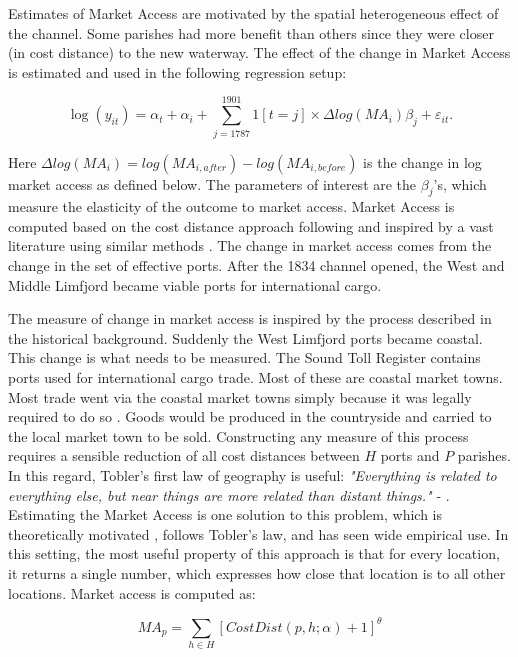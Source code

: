 \documentclass[11pt]{article}
\begin{document}
Estimates of Market Access are motivated by the spatial heterogeneous effect of the channel. Some parishes had more benefit than others since they were closer (in cost distance) to the new waterway. The effect of the change in Market Access is estimated and used in the following regression setup: 

\begin{equation}
\label{eq:eq503}
\log(y_{it})= \alpha_t + \alpha_i + \sum_{j=1787}^{1901} 1[t=j] \times \Delta log(MA_i)\beta_{j} + \varepsilon_{it}.
\end{equation}

Here $\Delta log(MA_i) = log(MA_{i,after}) - log(MA_{i,before})$ is the change in log market access as defined below. The parameters of interest are the $\beta_{j}$'s, which measure the elasticity of the outcome to market access.  Market Access is computed based on the cost distance approach following \cite{rauch2022a} and inspired by a vast literature using similar methods \citep{Harris1954, Redding2008, Ahlfeldt2015, Donaldson2016}. The change in market access comes from the change in the set of effective ports. After the 1834 channel opened, the West and Middle Limfjord became viable ports for international cargo. 

The measure of change in market access is inspired by the process described in the historical background. Suddenly the West Limfjord ports became coastal. This change is what needs to be measured. The Sound Toll Register contains ports used for international cargo trade. Most of these are coastal market towns. Most trade went via the coastal market towns simply because it was legally required to do so \citep{Degn1989}. Goods would be produced in the countryside and carried to the local market town to be sold. Constructing any measure of this process requires a sensible reduction of all cost distances between $H$ ports and $P$ parishes. In this regard, Tobler's first law of geography is useful: \textit{"Everything is related to everything else, but near things are more related than distant things."} - \cite{Tobler1970}. Estimating the Market Access is one solution to this problem, which is theoretically motivated \citep{eaton2002}, follows Tobler's law, and has seen wide empirical use. In this setting, the most useful property of this approach is that for every location, it returns a single number, which expresses how close that location is to all other locations. Market access is computed as:

\begin{equation}
\label{eq:MA2}
{MA}_p = \sum_{h \in H} [CostDist(p, h; \alpha) + 1]^\theta
\end{equation}
\end{document}
